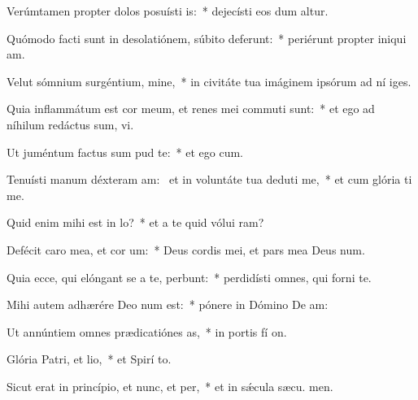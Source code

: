 \item Verúmtamen propter dolos posuísti is:~* dejecísti eos dum altur.
\item Quómodo facti sunt in desolatiónem, súbito deferunt:~* periérunt propter iniqui am.
\item Velut sómnium surgéntium, mine,~* in civitáte tua imáginem ipsórum ad ní iges.
\item Quia inflammátum est cor meum, et renes mei commuti sunt:~* et ego ad níhilum redáctus sum,  vi.
\item Ut juméntum factus sum pud te:~* et ego  cum.
\item Tenuísti manum déxteram am:~\pscross{} et in voluntáte tua deduti me,~* et cum glória ti me.
\item Quid enim mihi est in lo?~* et a te quid vólui  ram?
\item Defécit caro mea, et cor um:~* Deus cordis mei, et pars mea Deus  num.
\item Quia ecce, qui elóngant se a te, perbunt:~* perdidísti omnes, qui forni  te.
\item Mihi autem adhærére Deo num est:~* pónere in Dómino De  am:
\item Ut annúntiem omnes prædicatiónes as,~* in portis fí on.
\item Glória Patri, et lio,~* et Spirí to.
\item Sicut erat in princípio, et nunc, et per,~* et in sǽcula sæcu. men.
